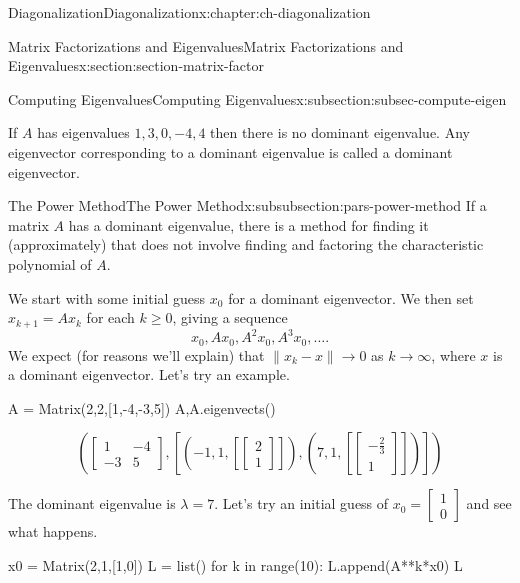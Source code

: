 \documentclass[oneside,10pt,]{book}
\numberwithin{equation}{section}
\newcommand{\bbm}{\begin{bmatrix}}
\newcommand{\ebm}{\end{bmatrix}}
\newcommand{\amp}{&}
\begin{document}
\begin{chapterptx}{Diagonalization}{}{Diagonalization}{}{}{x:chapter:ch-diagonalization}
\begin{sectionptx}{Matrix Factorizations and Eigenvalues}{}{Matrix Factorizations and Eigenvalues}{}{}{x:section:section-matrix-factor}
\begin{subsectionptx}{Computing Eigenvalues}{}{Computing Eigenvalues}{}{}{x:subsection:subsec-compute-eigen}
\begin{introduction}{}
\par
If \(A\) has eigenvalues \(1,3,0,-4,4\) then there is no dominant eigenvalue. Any eigenvector corresponding to a dominant eigenvalue is called a dominant eigenvector.%
\end{introduction}%
%
%
\typeout{************************************************}
\typeout{************************************************}
%
\begin{subsubsectionptx}{The Power Method}{}{The Power Method}{}{}{x:subsubsection:pars-power-method}
If a matrix \(A\) has a dominant eigenvalue, there is a method for finding it (approximately) that does not involve finding and factoring the characteristic polynomial of \(A\).%
\par
We start with some initial guess \(x_0\) for a dominant eigenvector. We then set \(x_{k+1} = Ax_k\) for each \(k\geq 0\), giving a sequence%
\begin{equation*}
x_0, Ax_0, A^2x_0, A^3x_0,\ldots\text{.}
\end{equation*}
We expect (for reasons we'll explain) that \(\lVert x_k-x\rVert \to 0\) as \(k\to\infty\), where \(x\) is a dominant eigenvector. Let's try an example.%
\begin{sageinput}
A = Matrix(2,2,[1,-4,-3,5])
A,A.eigenvects()
\end{sageinput}
\begin{sageoutput}
\[\left(\bbm 1\amp -4\\-3\amp 5\ebm, \left[\left(-1, 1, \left[\bbm 2\\1\ebm\right]\right),\left(7, 1, \left[\bbm -\frac23\\1\ebm\right]\right)\right]\right)\]
\end{sageoutput}
The dominant eigenvalue is \(\lambda = 7\). Let's try an initial guess of \(x_0=\begin{bmatrix}1\\0\end{bmatrix}\) and see what happens.%
\begin{sageinput}
x0 = Matrix(2,1,[1,0])
L = list()
for k in range(10):
    L.append(A**k*x0)
L
\end{sageinput}
\begin{sageoutput}
\begin{align*}

\end{align*}
\end{sageoutput}
\end{subsubsectionptx}
\end{subsectionptx}
\end{sectionptx}
\end{chapterptx}
\end{document}
